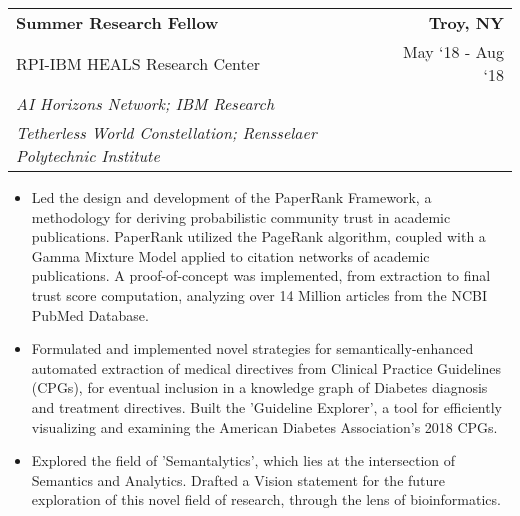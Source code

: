 \documentclass[10pt, letterpaper]{article}
\newcommand{\tabularxwidth}{\textwidth}
\begin{document}
    \begin{minipage}{\tabularxwidth}

        \begin{tabularx}{\tabularxwidth}{X r}
            \textbf{Summer Research Fellow} & \textbf{Troy, 
        NY} \\
            RPI-IBM HEALS Research Center & 
        
    May ‘18 - 
    Aug ‘18 \\
            
                
                    \textit{AI Horizons Network; IBM Research} & \\
                
                    \textit{Tetherless World Constellation; Rensselaer Polytechnic Institute} & \\
                
            
            
        \end{tabularx}

        \begin{itemize}[noitemsep, topsep=3pt, parsep=0pt, partopsep=0pt]
            
                \item 
    Led the design and development of the PaperRank Framework, a methodology for deriving probabilistic community trust in academic publications. PaperRank utilized the PageRank algorithm, coupled with a Gamma Mixture Model applied to citation networks of academic publications. A proof-of-concept was implemented, from extraction to final trust score computation, analyzing over 14 Million articles from the NCBI PubMed Database.
            
                \item 
    Formulated and implemented novel strategies for semantically-enhanced automated extraction of medical directives from Clinical Practice Guidelines (CPGs), for eventual inclusion in a knowledge graph of Diabetes diagnosis and treatment directives. Built the 'Guideline Explorer', a tool for efficiently visualizing and examining the American Diabetes Association's 2018 CPGs.
            
                \item 
    Explored the field of 'Semantalytics', which lies at the intersection of Semantics and Analytics. Drafted a Vision statement for the future exploration of this novel field of research, through the lens of bioinformatics.
            

\end{itemize}
\end{minipage}
\end{document}

